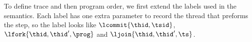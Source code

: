 
To define trace and then program order, we first extend the labels used in the semantics.
Each label has one extra parameter to record the thread that preforms the step, so the label looks like \( \lcommit{\thid,\tsid} \), \( \lfork{\thid,\thid',\prog} \) and \( \ljoin{\thid,\thid',\ts} \).

